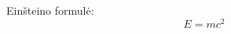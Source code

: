 \documentclass[12pt]{article}
\begin{document}
Einšteino formulė:
\begin{equation}
E=mc^2
\end{equation}
\end{document}
